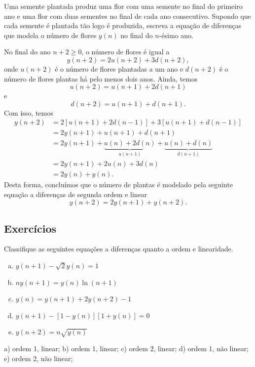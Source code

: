 \begin{exeresol}
  Uma semente plantada produz uma flor com uma semente no final do primeiro ano e uma flor com duas sementes no final de cada ano consecutivo. Supondo que cada semente é plantada tão logo é produzida, escreva a equação de diferenças que modela o número de flores $y(n)$ no final do $n$-ésimo ano.
\end{exeresol}
\begin{resol}
  No final do ano $n+2\geq 0$, o número de flores é igual a
  \begin{equation}
    y(n+2) = 2u(n+2) + 3d(n+2),
  \end{equation}
  onde $u(n+2)$ é o número de flores plantadas a um ano e $d(n+2)$ é o número de flores plantas há pelo menos dois anos. Ainda, temos
  \begin{equation}
    u(n+2) = u(n+1) + 2d(n+1)
  \end{equation}
  e
  \begin{equation}
    d(n+2) = u(n+1) + d(n+1).
  \end{equation}
  Com isso, temos
  \begin{align}
    y(n+2) &= 2\left[u(n+1)+2d(n-1)\right] + 3\left[u(n+1)+d(n-1)\right] \\
          &= 2y(n+1) + u(n+1) + d(n+1) \\
          &= 2y(n+1) + \underbrace{u(n) + 2d(n)}_{u(n+1)} + \underbrace{u(n) + d(n)}_{d(n+1)} \\
          &= 2y(n+1) + 2u(n) + 3d(n) \\
          &= 2y(n) + y(n).
  \end{align}
  Desta forma, concluímos que o número de plantas é modelado pela seguinte equação a diferenças de segunda ordem e linear
  \begin{equation}
    y(n+2) = 2y(n+1) + y(n+2).
  \end{equation}
\end{resol}

\subsection*{Exercícios}

\begin{exer}
  Classifique as seguintes equações a diferenças quanto a ordem e linearidade.
  \begin{enumerate}[a)]
  \item $\displaystyle y(n+1)-\sqrt{2}y(n) = 1$
  \item $\displaystyle ny(n+1) = y(n)\ln(n+1)$
  \item $\displaystyle y(n) = y(n+1) + 2y(n+2) - 1$
  \item $\displaystyle y(n+1) - \left[1-y(n)\right]\left[1+y(n)\right] = 0$
  \item $\displaystyle y(n+2) = n\sqrt{y(n)}$
  \end{enumerate}
\end{exer}
\begin{resp}
  a) ordem 1, linear; b) ordem 1, linear; c) ordem 2, linear; d) ordem 1, não linear; e) ordem 2, não linear;
\end{resp}


